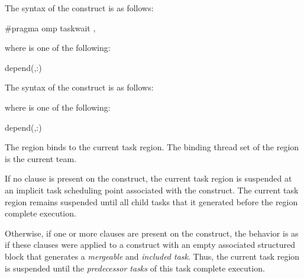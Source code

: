 \syntax
\begin{ccppspecific}
The syntax of the  construct is as follows:

\begin{ompcPragma}
#pragma omp taskwait \plc{[clause[ [},\plc{] clause] ... ] new-line}
\end{ompcPragma}

where  is one of the following:

\begin{indentedcodelist}
depend(\plc{[depend-modifier},\plc{]dependence-type }:)
\end{indentedcodelist}
\end{ccppspecific}

\begin{fortranspecific}
The syntax of the  construct is as follows:


where  is one of the following:

\begin{indentedcodelist}
depend(\plc{[depend-modifier},\plc{]dependence-type }:)
\end{indentedcodelist}

\end{fortranspecific}

\binding
The  region binds to the current task region. The binding thread 
set of the  region is the current team.

\descr

If no  clause is present on the  construct, the
current task region is suspended at an implicit task scheduling point
associated with the construct. The current task region remains suspended until
all child tasks that it generated before the  region complete
execution.

Otherwise, if one or more  clauses are present on the
 construct, the behavior is as if these clauses were applied to
a  construct with an empty associated structured block that
generates a \emph{mergeable} and \emph{included task}. Thus, the current task region 
is suspended until the \emph{predecessor tasks} of this task complete execution.

